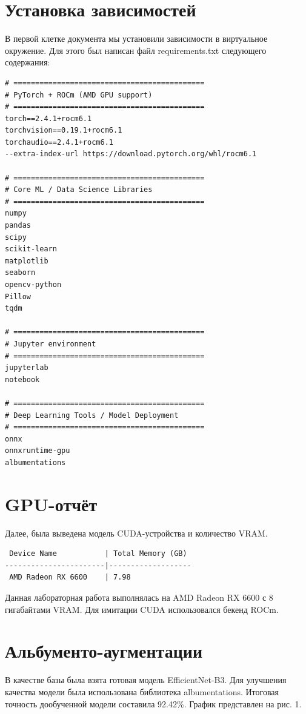 \documentclass[12pt,a4paper]{article}
\begin{document}
\section{Установка зависимостей}

В первой клетке документа мы установили зависимости в виртуальное окружение. Для этого был написан файл requirements.txt следующего содержания:

\begin{lstlisting}
# ============================================
# PyTorch + ROCm (AMD GPU support)
# ============================================
torch==2.4.1+rocm6.1
torchvision==0.19.1+rocm6.1
torchaudio==2.4.1+rocm6.1
--extra-index-url https://download.pytorch.org/whl/rocm6.1

# ============================================
# Core ML / Data Science Libraries
# ============================================
numpy
pandas
scipy
scikit-learn
matplotlib
seaborn
opencv-python
Pillow
tqdm

# ============================================
# Jupyter environment
# ============================================
jupyterlab
notebook

# ============================================
# Deep Learning Tools / Model Deployment
# ============================================
onnx
onnxruntime-gpu
albumentations
\end{lstlisting}

\section{GPU-отчёт}

Далее, была выведена модель CUDA-устройства и количество VRAM.
\begin{lstlisting}
 Device Name           | Total Memory (GB)
-----------------------|-------------------
 AMD Radeon RX 6600    | 7.98
\end{lstlisting}

Данная лабораторная работа выполнялась на AMD Radeon RX 6600 с 8 гигабайтами VRAM. Для имитации CUDA использовался бекенд ROCm.

\section{Альбументо-аугментации}

В качестве базы была взята готовая модель EfficientNet-B3. Для улучшения качества модели была использована библиотека albumentations. Итоговая точность дообученной модели составила 92.42\%. График представлен на рис. 1.
\end{document}
